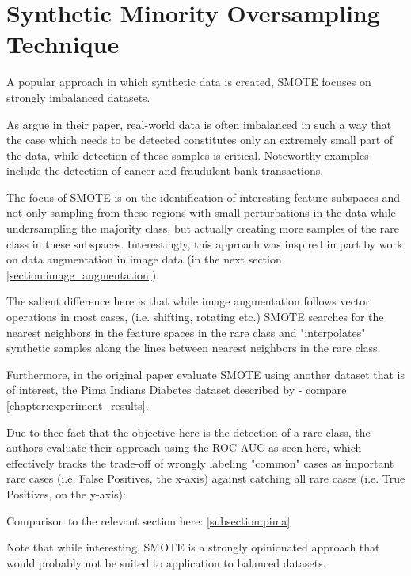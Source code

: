 \pagebreak

\section{Synthetic Minority Oversampling Technique}
\label{section:smote}

A popular approach in which synthetic data is created, \ac{SMOTE} focuses on strongly imbalanced datasets. 

As \cite{smote} argue in their paper, real-world data is often imbalanced in such a way that the case which needs to be detected constitutes only an extremely small part of the data, while detection of these samples is critical. Noteworthy examples include the detection of cancer and fraudulent bank transactions.

The focus of \ac{SMOTE} is on the identification of interesting feature subspaces and not only sampling from these regions with small perturbations in the data while undersampling the majority class, but actually creating more samples of the rare class in these subspaces. 
Interestingly, this approach was inspired in part by work on data augmentation in image data (in the next section \ref{section:image_augmentation}).

The salient difference here is that while image augmentation follows vector operations in most cases, (i.e. shifting, rotating etc.) \ac{SMOTE} searches for the nearest neighbors in the feature spaces in the rare class and "interpolates" synthetic samples along the lines between nearest neighbors in the rare class.

Furthermore, in the original paper \cite{smote} evaluate \ac{SMOTE} using another dataset that is of interest, the Pima Indians Diabetes dataset described by \cite{diabetes} - compare \ref{chapter:experiment_results}.

\pagebreak

Due to thee fact that the objective here is the detection of a rare class, the authors evaluate their approach using the \ac{ROC} \ac{AUC} as seen here, which effectively tracks the trade-off of wrongly labeling "common" cases as important rare cases (i.e. False Positives, the x-axis) against catching all rare cases (i.e. True Positives, on the y-axis):


Comparison to the relevant section here: \ref{subsection:pima}

Note that while interesting, \ac{SMOTE} is a strongly opinionated approach that would probably not be suited to application to balanced datasets.

